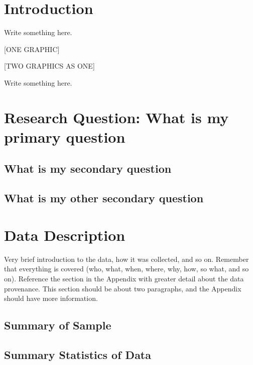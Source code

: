 \documentclass[]{article}
\begin{document}
\vskip -8.5pt




\noindent  

\section{Introduction}
\label{sec:intro}

Write something here.

{[}ONE GRAPHIC{]}

{[}TWO GRAPHICS AS ONE{]}

Write something here.

\section{Research Question:  What is my primary question}
\label{sec:rq}

\subsection{What is my secondary question}
\label{sec:rq2}

\subsection{What is my other secondary question}
\label{sec:rq3}

\section{Data Description}
\label{sec:data}

Very brief introduction to the data, how it was collected, and so on.
Remember that everything is covered (who, what, when, where, why, how,
so what, and so on). Reference the section in the Appendix with greater
detail about the data provenance. This section should be about two
paragraphs, and the Appendix should have more information.

\subsection{Summary of Sample}
\label{sec:data-sample}

\subsection{Summary Statistics of Data}
\label{sec:data-summary}
\end{document}
